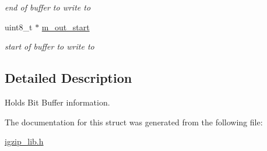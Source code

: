 \begin{DoxyCompactItemize}
\begin{DoxyCompactList}\small\item\em end of buffer to write to \end{DoxyCompactList}\item 
\hypertarget{structBitBuf2_a8daeab9c6fe5e664a91a6c6895124b7a}{uint8\-\_\-t $\ast$ \hyperlink{structBitBuf2_a8daeab9c6fe5e664a91a6c6895124b7a}{m\-\_\-out\-\_\-start}}\label{structBitBuf2_a8daeab9c6fe5e664a91a6c6895124b7a}

\begin{DoxyCompactList}\small\item\em start of buffer to write to \end{DoxyCompactList}\end{DoxyCompactItemize}


\subsection{Detailed Description}
Holds Bit Buffer information. 

The documentation for this struct was generated from the following file\-:\begin{DoxyCompactItemize}
\item 
\hyperlink{igzip__lib_8h}{igzip\-\_\-lib.\-h}\end{DoxyCompactItemize}
